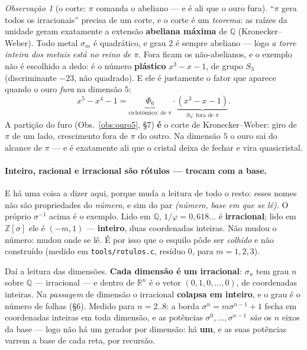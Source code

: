 \documentclass[11pt]{article}
\newcommand{\code}[1]{\texttt{\small #1}}
\newcommand{\Z}{\mathbb Z}
\newcommand{\R}{\mathbb R}
\theoremstyle{plain}
\theoremstyle{remark}
\newtheorem{obs}{Observação}
\begin{document}
\begin{obs}[o corte: $\pi$ comanda o abeliano --- e é ali que o ouro fura]
``$\pi$ gera todos os irracionais'' precisa de um corte, e o corte é um \emph{teorema}: as raízes da
unidade geram exatamente a extensão \textbf{abeliana máxima} de $\mathbb Q$ (Kronecker--Weber). Todo
metal $\sigma_m$ é quadrático, e grau $2$ é sempre abeliano --- logo \emph{a torre inteira dos metais
está no reino de $\pi$}. Fora ficam os não-abelianos, e o exemplo não é escolhido a dedo: é o número
\textbf{plástico} $x^3-x-1$, de grupo $S_3$ (discriminante $-23$, não quadrado). E ele é justamente o
fator que aparece quando o ouro \emph{fura} na dimensão $5$:
\[
 x^5-x^4-1=\underbrace{\Phi_6}_{\text{ciclotômico: de }\pi}\cdot\underbrace{(x^3-x-1)}_{S_3:\ \text{fora de }\pi}.
\]
A partição do furo (Obs.~\ref{obs:ouro5}, §7) \textbf{é} o corte de Kronecker--Weber: giro de $\pi$ de
um lado, crescimento fora de $\pi$ do outro. Na dimensão $5$ o ouro sai do alcance de $\pi$ --- e é
exatamente ali que o cristal deixa de fechar e vira quasicristal.
\end{obs}

\paragraph{Inteiro, racional e irracional são rótulos --- trocam com a base.}\label{obs:rotulos}
E há uma coisa a dizer aqui, porque muda a leitura de todo o resto: esses nomes não são propriedades
do \emph{número}, e sim do par \emph{(número, base em que se lê)}. O próprio $\sigma^{-1}$ acima é o
exemplo. Lido em $\mathbb Q$, $1/\varphi=0{,}618\dots$ é \textbf{irracional}; lido em $\Z[\sigma]$ ele
é $(-m,1)$ --- \textbf{inteiro}, duas coordenadas inteiras. Não mudou o número: mudou onde se lê. É por
isso que o esquilo pôde ser \emph{colhido} e não construído (medido em \code{tools/rotulos.c}, resíduo
$0$, para $m=1,2,3$).

Daí a leitura das dimensões. \textbf{Cada dimensão é um irracional}: $\sigma_n$ tem grau $n$ sobre
$\mathbb Q$ --- irracional --- e dentro de $\R^n$ é o vetor $(0,1,0,\dots,0)$, de coordenadas inteiras.
Na \emph{passagem} de dimensão o irracional \textbf{colapsa em inteiro}, e o grau é o número de folhas
(§6). Medido para $n=2..8$: a borda $\sigma^n=m\sigma^{n-1}+1$ fecha em coordenadas inteiras em toda
dimensão, e as potências $\sigma^0,\dots,\sigma^{n-1}$ \emph{são} os $n$ eixos da base --- logo não há
um gerador por dimensão: há \textbf{um}, e as suas potências varrem a base de cada reta, por recursão.
\end{document}
